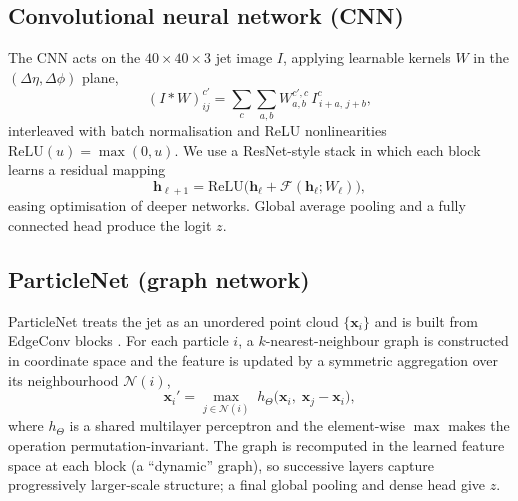 \documentclass[preprint,12pt]{elsarticle}
\begin{document}
\subsection{Convolutional neural network (CNN)}
\label{sec:cnn}
The CNN acts on the $40\times40\times3$ jet image $I$, applying learnable
kernels $W$ in the $(\Delta\eta,\Delta\phi)$ plane,
\begin{equation}
(I * W)_{ij}^{c'} = \sum_{c}\sum_{a,b} W^{c',c}_{a,b}\,
I^{c}_{\,i+a,\,j+b},
\label{eq:conv}
\end{equation}
interleaved with batch normalisation and ReLU nonlinearities
$\mathrm{ReLU}(u)=\max(0,u)$. We use a ResNet-style stack
\citep{he2016resnet} in which each block learns a residual mapping
\begin{equation}
\mathbf{h}_{\ell+1} = \mathrm{ReLU}\bigl(\mathbf{h}_\ell
+ \mathcal{F}(\mathbf{h}_\ell;W_\ell)\bigr),
\label{eq:resnet}
\end{equation}
easing optimisation of deeper networks. Global average pooling and a
fully connected head produce the logit $z$.

\subsection{ParticleNet (graph network)}
\label{sec:particlenet}
ParticleNet \citep{qu2020particlenet} treats the jet as an unordered point
cloud $\{\mathbf{x}_i\}$ and is built from EdgeConv blocks
\citep{wang2019dgcnn}. For each particle $i$, a $k$-nearest-neighbour graph is
constructed in coordinate space and the feature is updated by a symmetric
aggregation over its neighbourhood $\mathcal{N}(i)$,
\begin{equation}
\mathbf{x}_i' = \operatorname*{max}_{j\in\mathcal{N}(i)}\;
h_\Theta\!\bigl(\mathbf{x}_i,\;\mathbf{x}_j-\mathbf{x}_i\bigr),
\label{eq:edgeconv}
\end{equation}
where $h_\Theta$ is a shared multilayer perceptron and the element-wise
$\max$ makes the operation permutation-invariant. The graph is recomputed in
the learned feature space at each block (a ``dynamic'' graph), so successive
layers capture progressively larger-scale structure; a final global pooling
and dense head give $z$.
\end{document}
